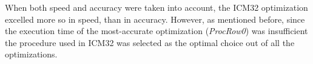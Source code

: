 When both speed and accuracy were taken into account, the ICM32 optimization excelled more so in speed, than in accuracy. However, as mentioned before, since the execution time of the most-accurate optimization (\textit{ProcRow0}) was insufficient the procedure used in ICM32 was selected as the optimal choice out of all the optimizations.